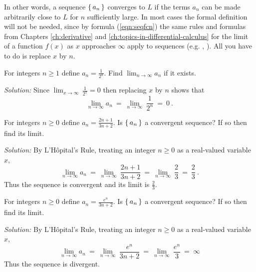 In other words, a sequence $\left\lbrace\mspace{3mu}a_n\mspace{3mu}\right\rbrace$ converges to $L$ if the terms $a_n$ can
be made arbitrarily close to $L$ for $n$ sufficiently large. In most cases the
formal definition will not be needed, since by formula (\ref{eqn:seqfcn}) the
same rules and formulas from Chapters \ref{ch:derivative} and \ref{ch:topics-in-differential-calculus} for the limit of a function $f(x)$
as $x$ approaches $\infty$ apply to sequences (e.g. ,
). All you have to do is replace $x$ by $n$.

\begin{exmp}
\noindent For integers $n \ge 1$ define $a_n = \frac{1}{2^n}$. Find
$\displaystyle\lim_{n \to \infty} a_n$ if it exists.\vspace{1mm}
\par\noindent\emph{Solution:} Since
$\displaystyle\lim_{x \to \infty} \,\frac{1}{2^x} = 0$ then replacing $x$ by $n$
shows that
\[
\lim_{n \to \infty} a_n ~=~ \lim_{n \to \infty}~ \frac{1}{2^n} ~=~ 0 ~.
\]
\end{exmp}
\divider
\newpage
\begin{exmp}
\noindent For integers $n \ge 0$ define $a_n = \frac{2n+1}{3n+2}$. Is
$\left\lbrace\mspace{3mu}a_n\mspace{3mu}\right\rbrace$ a convergent sequence? If so then find its limit.\vspace{1mm}
\par\noindent\emph{Solution:} By L'H\^{o}pital's Rule, treating an integer
$n\ge 0$ as a real-valued variable $x$,
\[
\lim_{n \to \infty} a_n ~=~ \lim_{n \to \infty}~ \frac{2n+1}{3n+2} ~=~ 
\lim_{n \to \infty}~ \frac{2}{3} ~=~ \frac{2}{3} ~.
\]
Thus the sequence is convergent and its limit is $\frac{2}{3}$.
\end{exmp}
\begin{exmp}
\noindent For integers $n \ge 0$ define $a_n = \frac{e^n}{3n+2}$. Is
$\left\lbrace\mspace{3mu}a_n\mspace{3mu}\right\rbrace$ a convergent sequence? If so then find its limit.\vspace{1mm}
\par\noindent\emph{Solution:} By L'H\^{o}pital's Rule, treating an integer
$n\ge 0$ as a real-valued variable $x$,
\[
\lim_{n \to \infty} a_n ~=~ \lim_{n \to \infty}~ \frac{e^n}{3n+2} ~=~
\lim_{n \to \infty}~ \frac{e^n}{3} ~=~ \infty
\]
Thus the sequence is divergent.
\end{exmp}

